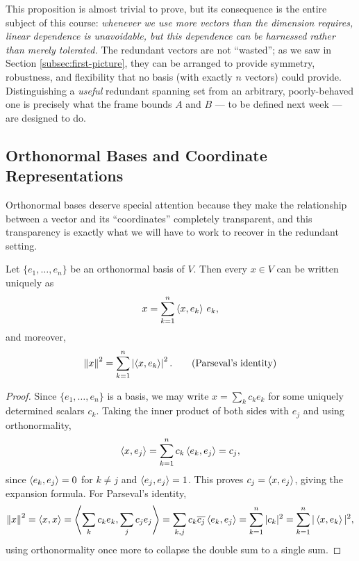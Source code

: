 This proposition is almost trivial to prove, but its consequence is the entire subject of this course: \emph{whenever we use more vectors than the dimension requires, linear dependence is unavoidable, but this dependence can be harnessed rather than merely tolerated.} The redundant vectors are not ``wasted''; as we saw in Section \ref{subsec:first-picture}, they can be arranged to provide symmetry, robustness, and flexibility that no basis (with exactly $n$ vectors) could provide. Distinguishing a \emph{useful} redundant spanning set from an arbitrary, poorly-behaved one is precisely what the frame bounds $A$ and $B$ --- to be defined next week --- are designed to do.

\subsection{Orthonormal Bases and Coordinate Representations}
\label{subsec:onb}

Orthonormal bases deserve special attention because they make the relationship between a vector and its ``coordinates'' completely transparent, and this transparency is exactly what we will have to work to recover in the redundant setting.

\begin{theorem}
\label{thm:onb-expansion}
Let $\{e_1, \dots, e_n\}$ be an orthonormal basis of $V$. Then every $x \in V$ can be written uniquely as
$$
x = \sum_{k=1}^n \left\langle x, e_k \right\rangle \, e_k,
$$
and moreover,
$$
\left\| x \right\|^2 = \sum_{k=1}^n \left| \left\langle x, e_k \right\rangle \right|^2. \qquad \text{(Parseval's identity)}
$$
\end{theorem}

\begin{proof}
Since $\{e_1, \dots, e_n\}$ is a basis, we may write $x = \sum_k c_k e_k$ for some uniquely determined scalars $c_k$. Taking the inner product of both sides with $e_j$ and using orthonormality,
$$
\left\langle x, e_j \right\rangle = \sum_{k=1}^n c_k \left\langle e_k, e_j \right\rangle = c_j,
$$
since $\left\langle e_k, e_j \right\rangle = 0$ for $k \neq j$ and $\left\langle e_j, e_j \right\rangle = 1$. This proves $c_j = \left\langle x, e_j \right\rangle$, giving the expansion formula. For Parseval's identity,
$$
\left\| x \right\|^2 = \left\langle x, x \right\rangle = \left\langle \sum_k c_k e_k, \sum_j c_j e_j \right\rangle = \sum_{k,j} c_k \overline{c_j} \left\langle e_k, e_j \right\rangle = \sum_{k=1}^n |c_k|^2 = \sum_{k=1}^n |\left\langle x, e_k \right\rangle|^2,
$$
using orthonormality once more to collapse the double sum to a single sum.
\end{proof}

